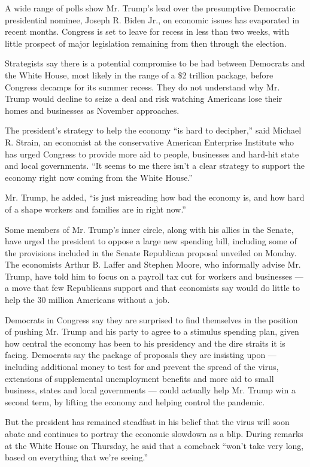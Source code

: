 A wide range of polls show Mr. Trump's lead over the presumptive
Democratic presidential nominee, Joseph R. Biden Jr., on economic issues
has evaporated in recent months. Congress is set to leave for recess in
less than two weeks, with little prospect of major legislation remaining
from then through the election.

Strategists say there is a potential compromise to be had between
Democrats and the White House, most likely in the range of a \$2
trillion package, before Congress decamps for its summer recess. They do
not understand why Mr. Trump would decline to seize a deal and risk
watching Americans lose their homes and businesses as November
approaches.

The president's strategy to help the economy ``is hard to decipher,''
said Michael R. Strain, an economist at the conservative American
Enterprise Institute who has urged Congress to provide more aid to
people, businesses and hard-hit state and local governments. ``It seems
to me there isn't a clear strategy to support the economy right now
coming from the White House.''

Mr. Trump, he added, ``is just misreading how bad the economy is, and
how hard of a shape workers and families are in right now.''

Some members of Mr. Trump's inner circle, along with his allies in the
Senate, have urged the president to oppose a large new spending bill,
including some of the provisions included in the Senate Republican
proposal unveiled on Monday. The economists Arthur B. Laffer and Stephen
Moore, who informally advise Mr. Trump, have told him to focus on a
payroll tax cut for workers and businesses --- a move that few
Republicans support and that economists say would do little to help the
30 million Americans without a job.

Democrats in Congress say they are surprised to find themselves in the
position of pushing Mr. Trump and his party to agree to a stimulus
spending plan, given how central the economy has been to his presidency
and the dire straits it is facing. Democrats say the package of
proposals they are insisting upon --- including additional money to test
for and prevent the spread of the virus, extensions of supplemental
unemployment benefits and more aid to small business, states and local
governments --- could actually help Mr. Trump win a second term, by
lifting the economy and helping control the pandemic.

But the president has remained steadfast in his belief that the virus
will soon abate and continues to portray the economic slowdown as a
blip. During remarks at the White House on Thursday, he said that a
comeback ``won't take very long, based on everything that we're
seeing.''

